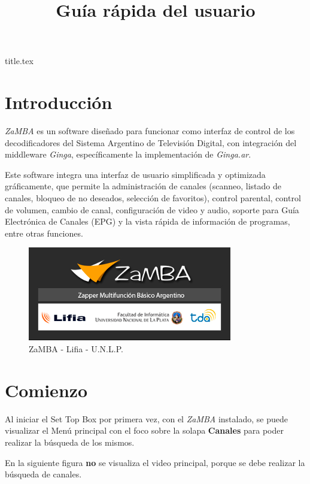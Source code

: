 \documentclass{article}
\begin{document}
\title{Guía rápida del usuario}
{title.tex}

\tableofcontents

\section{Introducción}

\textit{ZaMBA} es un software diseñado para funcionar como interfaz de control de los decodificadores del Sistema Argentino de Televisión Digital, con integración del middleware \textit{Ginga}, específicamente la implementación de \textit{Ginga.ar}.

Este software integra una interfaz de usuario simplificada y optimizada gráficamente, que permite la administración de canales (scanneo, listado de canales, bloqueo de no deseados, selección de favoritos), control parental, control de volumen, cambio de canal, configuración de video y audio, soporte para Guía Electrónica de Canales (EPG) y la vista rápida de información de programas, entre otras funciones.

\vspace{0.5cm}
\begin{figure}[h]
 \centerline{\includegraphics[scale=0.8,keepaspectratio=true]{zamba}}
 \caption{ZaMBA - Lifia - U.N.L.P.}
\end{figure}
\pagebreak

\section{Comienzo}

Al iniciar el Set Top Box por primera vez, con el \textit{ZaMBA} instalado, se puede visualizar el Menú principal con el foco sobre la solapa \textbf{Canales} para poder realizar la búsqueda de los mismos.

En la siguiente figura \textbf{no} se visualiza el video principal, porque se debe realizar la búsqueda de canales.
\end{document}
